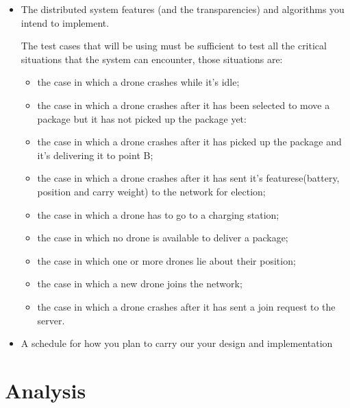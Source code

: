 \documentclass[a4paper, oneside]{memoir}
\begin{document}
\begin{itemize}
\item The distributed system features (and the transparencies) and algorithms you intend to implement.


The test cases that will be using must be sufficient to test all the critical situations that the system can encounter, those situations are:
\begin{itemize}
\item the case in which a drone crashes while it's idle;
\item the case in which a drone crashes after it has been selected to move a package but it has not picked up the package yet:
\item the case in which a drone crashes after it has picked up the package and it's delivering it to point B;
\item the case in which a drone crashes after it has sent it's featurese(battery, position and carry weight) to the network for election;
\item the case in which a drone has to go to a charging station;
\item the case in which no drone is available to deliver a package;
\item the case in which one or more drones lie about their position;
\item the case in which a new drone joins the network;
\item the case in which a drone crashes after it has sent a join request to the server.
\end{itemize}




\item A schedule for how you plan to carry our your design and implementation
\end{itemize}



\chapter{Analysis}\label{ch:analysis}

\end{document}
